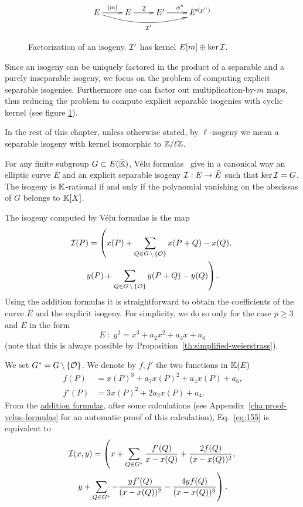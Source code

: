 \begin{figure}
  \centering
  \[\xymatrix{
    E \ar[r]^{[m]}\ar@/_1pc/[rrr]_{\I'} & E \ar[r]^\I & E' \ar[r]^{\frobisog^n} & E'^{(p^n)}
  }\]
  \label{fig:fact}
  \caption{Factorization of an isogeny. $\mathcal{I}'$ has kernel $E[m]\oplus\ker\mathcal{I}$.}
\end{figure}

Since an isogeny can be uniquely factored in the product of a
separable and a purely inseparable isogeny, we focus on the problem of
computing explicit separable isogenies. Furthermore one can factor out
multiplication-by-$m$ maps, thus reducing the problem to compute
explicit separable isogenies with cyclic kernel (see figure
\ref{fig:fact}).

In the rest of this chapter, unless otherwise stated, by
$\ell$-isogeny we mean a separable isogeny with kernel isomorphic to
$\mathbb{Z}/\ell\mathbb{Z}$.


For any finite subgroup $G \subset E(\bar{\mathbb{K}})$, Vélu
formulas~\cite{velu71} give in a canonical way an elliptic curve
$\bar{E}$ and an explicit separable isogeny $\mathcal{I}:E\rightarrow \bar{E}$
such that $\ker\mathcal{I}=G$. The isogeny is $\mathbb{K}$-rational if and only if the
polynomial vanishing on the abscissas of $G$ belongs to $\mathbb{K}[X]$.

The isogeny computed by Vélu formulas is the map
\begin{multline}
  \label{eq:155}
  \mathcal{I}(P) = \left(x(P) + \sum_{Q\in G\,\backslash\,\{\mathcal{O}\}}x(P+Q) - x(Q),\right.\\
    \left.y(P) + \sum_{Q\in G\,\backslash\,\{\mathcal{O}\}}y(P+Q) - y(Q)\right)
  \text{.}
\end{multline}
Using the addition formulas it is straightforward to obtain the
coefficients of the curve $\bar{E}$ and the explicit isogeny.  For
simplicity, we do so only for the case $p\ge3$ and $E$ in the form
\begin{equation}
  \label{eq:160}
  E \;:\; y^2 =  x^3 + a_2x^2 + a_4x + a_6
\end{equation}
(note that this is always possible by
Proposition~\ref{th:simplified-weierstrass}). 

We set $G^\ast=G\,\backslash\,\{\mathcal{O}\}$. We denote by $f,f'$ the two
functions in $\mathbb{K}(E)$
\begin{equation}
  \label{eq:162}
  \begin{aligned}
    f(P) &= x(P)^3 + a_2x(P)^2 + a_4x(P) + a_6
    \text{,}\\
    f'(P) &= 3x(P)^2 + 2a_2x(P) + a_4
    \text{.}
  \end{aligned}
\end{equation}
From the \hyperref[eq:121]{addition formulas}, after some calculations
(see Appendix~\ref{cha:proof-velus-formulas} for an automatic proof of
this calculation), Eq.~\eqref{eq:155} is equivalent to
\begin{multline}
  \label{eq:161}
  \mathcal{I}(x,y) = \left(x + \sum_{Q\in G^\ast} \frac{f'(Q)}{x-x(Q)} + \frac{2f(Q)}{(x-x(Q))^2}\text{,}\right.\\
  \left.y + \sum_{Q\in G^\ast} -\frac{yf'(Q)}{(x-x(Q))^2} - \frac{4yf(Q)}{(x-x(Q))^3}\right)
  \text{.}
\end{multline}

